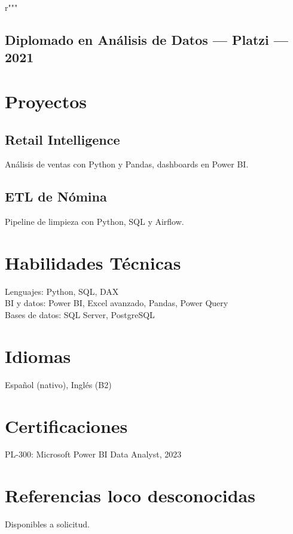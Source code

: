 r"""\documentclass[11pt,a4paper]{article}
\begin{document}
\subsection*{Diplomado en Análisis de Datos — Platzi — 2021}

\section*{Proyectos}
\subsection*{Retail Intelligence}
Análisis de ventas con Python y Pandas, dashboards en Power BI.
\subsection*{ETL de Nómina}
Pipeline de limpieza con Python, SQL y Airflow.

\section*{Habilidades Técnicas}
Lenguajes: Python, SQL, DAX \\
BI y datos: Power BI, Excel avanzado, Pandas, Power Query \\
Bases de datos: SQL Server, PostgreSQL

\section*{Idiomas}
Español (nativo), Inglés (B2)

\section*{Certificaciones}
PL-300: Microsoft Power BI Data Analyst, 2023

\section*{Referencias loco desconocidas}
Disponibles a solicitud.
\end{document}
